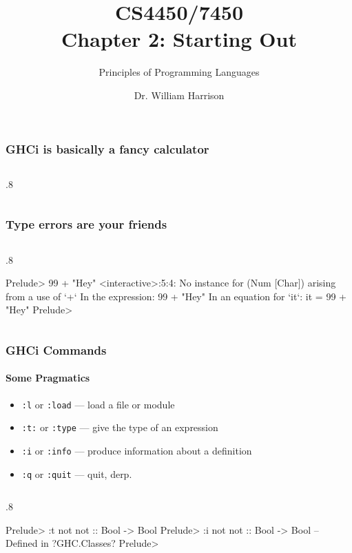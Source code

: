 \documentclass{beamer}
\title[CS4450]{CS4450/7450\\Chapter 2: Starting Out}
\subtitle{Principles of Programming Languages}
\author[Bill Harrison]{Dr. William Harrison}
\institute{University of Missouri}
\newenvironment{codeblock}[1][.8]{%
\begin{columns}
\begin{column}{#1\linewidth}
\begin{exampleblock}{}}{%
\end{exampleblock}
\end{column}
\end{columns}}
\begin{document}
\frame{\titlepage}

\begin{frame}[fragile]
\frametitle{GHCi is basically a fancy calculator}

\begin{codeblock}
\end{codeblock}
\end{frame}

\begin{frame}[fragile]
\frametitle{Type errors are your friends}
\begin{codeblock}
\begin{hcode}
Prelude> 99 + "Hey"
<interactive>:5:4:
    No instance for (Num [Char]) arising from a use of `+`
    In the expression: 99 + "Hey"
    In an equation for `it`: it = 99 + "Hey"
Prelude> 
\end{hcode}
\end{codeblock}

\end{frame}

\begin{frame}[fragile]
\frametitle{GHCi Commands}
\framesubtitle{Some Pragmatics}
\begin{itemize}
\item \verb+:l+ or \verb+:load+ --- load a file or module

\item \verb+:t:+ or \verb+:type+ --- give the type of an expression

\item \verb+:i+ or \verb+:info+ --- produce information about a definition

\item \verb+:q+ or \verb+:quit+ --- quit, derp.

\end{itemize}

\pause
\begin{codeblock}
\begin{hcode}
Prelude> :t not
not :: Bool -> Bool
Prelude> :i not
not :: Bool -> Bool 	-- Defined in ?GHC.Classes?
Prelude> 
\end{hcode}
\end{codeblock}

\end{frame}
\end{document}

